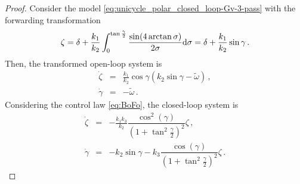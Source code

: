 \documentclass[letterpaper, 10 pt, conference]{ieeeconf}  %
\begin{document}
\begin{proof}
Consider the model \eqref{eq:unicycle_polar_closed_loop-Gv-3-pass}
with the forwarding transformation
\begin{equation}
\zeta = \delta + \frac{k_1}{k_2}\int_0^{\tan\frac{\gamma}{2}} \frac{\sin(4\arctan\sigma)}{2\sigma}{\rm d}\sigma = \delta + \dfrac{k_1}{k_2} \sin \gamma \,. \label{eq:forwarding_trans2}
\end{equation}
Then, the transformed open-loop system is
\begin{eqnarray}
\dot\zeta &=& \frac{k_1}{k_2}\cos\gamma\left(k_2\sin\gamma -%
\tilde\omega \right) \,,
\\
\dot\gamma &=& -  \tilde\omega\,.
\end{eqnarray}
Considering the control law \eqref{eq:BoFo}, 
the closed-loop system is
\begin{subequations}
    \label{eq:BoFo_temp}
\begin{eqnarray}
\dot\zeta &=& -\frac{k_1k_3}{k_2}\dfrac{\cos^2(\gamma)}{\left(1+\tan^2\frac{\gamma}{2}\right)^2} \zeta \,,
\\
\dot\gamma &=& - k_2\sin\gamma - k_3\dfrac{\cos(\gamma)}{\left(1+\tan^2\frac{\gamma}{2}\right)^2}\zeta\,.

\end{eqnarray}
\end{subequations}
\end{proof}
\end{document}
